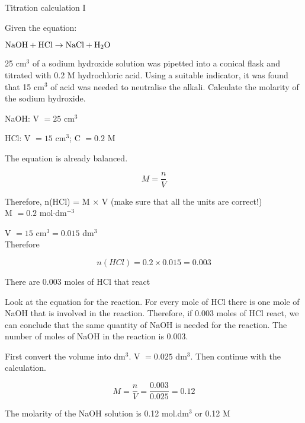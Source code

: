 \begin{wex}{Titration calculation I}{
Given the equation:
\begin{center}
$\rm{NaOH + HCl \rightarrow NaCl + H_{2}O}$
\end{center}

25 cm$^{3}$ of a sodium hydroxide solution was pipetted into a conical flask and titrated with 0.2 M hydrochloric acid. Using a suitable indicator, it was found that 15 cm$^{3}$ of acid was needed to neutralise the alkali. Calculate the molarity of the sodium hydroxide.\\
}

{

NaOH: V $= 25$ cm$^{3}$

HCl: V $= 15$ cm$^{3}$; C $= 0.2$ M

The equation is already balanced.\\

\begin{equation*}
M = \frac{n}{V}
\end{equation*}

Therefore, n(HCl) = M $\times$ V (make sure that all the units are correct!)\\

M $= 0.2$ mol$\cdot$dm$^{-3}$

V $= 15$ cm$^{3} = 0.015$ dm$^{3}$ \\

Therefore

\begin{equation*}
n(HCl) = 0.2 \times 0.015 = 0.003
\end{equation*}

There are 0.003 moles of HCl that react

Look at the equation for the reaction. For every mole of HCl there is one mole of NaOH that is involved in the reaction. Therefore, if 0.003 moles of HCl react, we can conclude that the same quantity of NaOH is needed for the reaction. The number of moles of NaOH in the reaction is 0.003.

First convert the volume into dm$^{3}$. V $= 0.025$ dm$^{3}$. Then continue with the calculation.

\begin{equation*}
M = \frac{n}{V} = \frac{0.003}{0.025} = 0.12
\end{equation*}

The molarity of the NaOH solution is 0.12 mol.dm$^{3}$ or 0.12 M
}
\end{wex}

